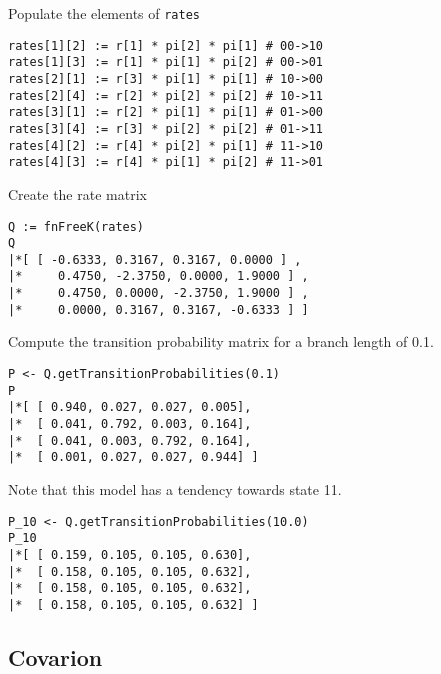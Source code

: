 Populate the elements of {\tt rates}

{\tt \begin{snugshade*}
\begin{lstlisting}
rates[1][2] := r[1] * pi[2] * pi[1] # 00->10
rates[1][3] := r[1] * pi[1] * pi[2] # 00->01
rates[2][1] := r[3] * pi[1] * pi[1] # 10->00
rates[2][4] := r[2] * pi[2] * pi[2] # 10->11
rates[3][1] := r[2] * pi[1] * pi[1] # 01->00
rates[3][4] := r[3] * pi[2] * pi[2] # 01->11
rates[4][2] := r[4] * pi[2] * pi[1] # 11->10
rates[4][3] := r[4] * pi[1] * pi[2] # 11->01
\end{lstlisting}
\end{snugshade*}}

Create the rate matrix

{\tt \begin{snugshade*}
\begin{lstlisting}
Q := fnFreeK(rates)
Q
|*[ [ -0.6333, 0.3167, 0.3167, 0.0000 ] ,
|*     0.4750, -2.3750, 0.0000, 1.9000 ] ,
|*     0.4750, 0.0000, -2.3750, 1.9000 ] ,
|*     0.0000, 0.3167, 0.3167, -0.6333 ] ]
\end{lstlisting}
\end{snugshade*}}

Compute the transition probability matrix for a branch length of 0.1.

{\tt \begin{snugshade*}
\begin{lstlisting}
P <- Q.getTransitionProbabilities(0.1)
P
|*[ [ 0.940, 0.027, 0.027, 0.005],
|*  [ 0.041, 0.792, 0.003, 0.164],
|*  [ 0.041, 0.003, 0.792, 0.164],
|*  [ 0.001, 0.027, 0.027, 0.944] ]
\end{lstlisting}
\end{snugshade*}}

Note that this model has a tendency towards state 11.

{\tt \begin{snugshade*}
\begin{lstlisting}
P_10 <- Q.getTransitionProbabilities(10.0)
P_10
|*[ [ 0.159, 0.105, 0.105, 0.630],
|*  [ 0.158, 0.105, 0.105, 0.632],
|*  [ 0.158, 0.105, 0.105, 0.632],
|*  [ 0.158, 0.105, 0.105, 0.632] ]
\end{lstlisting}
\end{snugshade*}}


\subsection{Covarion}

